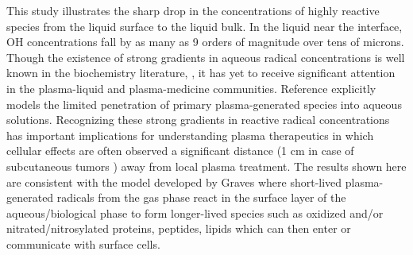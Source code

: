 This study illustrates the sharp drop in the concentrations of highly reactive species from the liquid surface to the liquid bulk. In the liquid near the interface, OH concentrations fall by as many as 9 orders of magnitude over tens of microns. Though the existence of strong gradients in aqueous radical concentrations is well known in the biochemistry literature, \cite{Bachi2013,Halliwell}, it has yet to receive significant attention in the plasma-liquid and plasma-medicine communities. Reference \cite{Chen2014a} explicitly models the limited penetration of primary plasma-generated species into aqueous solutions. Recognizing these strong gradients in reactive radical concentrations has important implications for understanding plasma therapeutics in which cellular effects are often observed a significant distance (1 cm in case of subcutaneous tumors \cite{Graves2014review}) away from local plasma treatment. The results shown here are consistent with the model developed by Graves \cite{Graves2014review} where short-lived plasma-generated radicals from the gas phase react in the surface layer of the aqueous/biological phase to form longer-lived species such as oxidized and/or nitrated/nitrosylated proteins, peptides, lipids which can then enter or communicate with surface cells.
